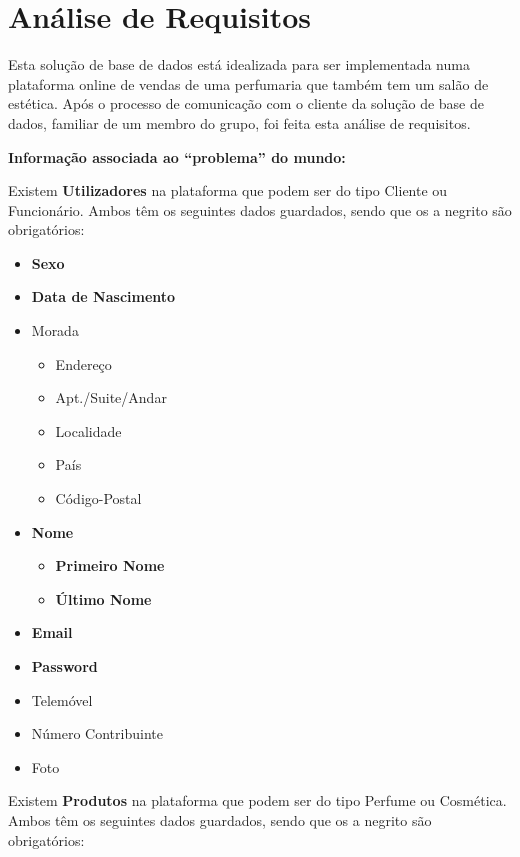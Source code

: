\documentclass[10pt,portuguese]{article}
\begin{document}
\pa

\clearpage
\section{Análise de Requisitos}

\par Esta solução de base de dados está idealizada para ser implementada numa plataforma online de vendas de uma perfumaria que também tem um salão de estética. Após o processo de comunicação com o cliente da solução de base de dados, familiar de um membro do grupo, foi feita esta análise de requisitos.

\par \textbf{Informação associada ao “problema” do mundo:}
\par Existem \textbf{Utilizadores} na plataforma que podem ser do tipo Cliente ou Funcionário. Ambos têm os seguintes dados guardados, sendo que os a negrito são obrigatórios:

\begin{itemize}
    \item \textbf{Sexo}
    \item \textbf{Data de Nascimento}
    \item Morada
    \begin{itemize}
        \item Endereço
        \item Apt./Suite/Andar
        \item Localidade
        \item País
        \item Código-Postal
    \end{itemize}
    \item \textbf{Nome}
    \begin{itemize}
        \item \textbf{Primeiro Nome}
        \item \textbf{Último Nome}
     \end{itemize}
     \item \textbf{Email}
     \item \textbf{Password}
     \item Telemóvel
     \item Número Contribuinte
     \item Foto
\end{itemize}

\par Existem \textbf{Produtos} na plataforma que podem ser do tipo Perfume ou Cosmética. Ambos têm os seguintes dados guardados, sendo que os a negrito são obrigatórios:
\end{document}
